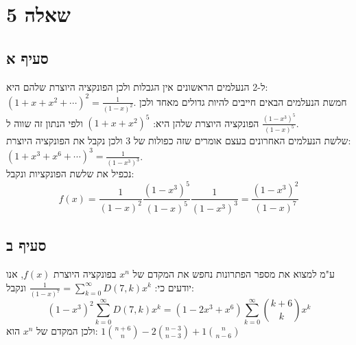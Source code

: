 \documentclass{article}
\begin{document}
	\pagebreak
	\section*{שאלה 5}
	\subsection*{סעיף א}
	ל-2 הנעלמים הראשונים אין הגבלות ולכן הפונקציה היוצרת שלהם היא: \\ $(1+x+x^2 + \cdots)^2 = \frac{1}{(1-x)^2}$.
	חמשת הנעלמים הבאים חייבים להיות גדולים מאחד ולכן הפונקציה היוצרת שלהן היא: $(1+x+x^2)^5$ ולפי הנתון זה שווה ל $\frac{(1-x^3)^5}{(1-x)^5}$. \\
	שלשת הנעלמים האחרונים בעצם אומרים שזה כפולות של 3 ולכן נקבל את הפונקציה היוצרת: $(1 + x^3 + x^6 + \cdots)^3 = \frac{1}{(1-x^3)^3}$. \\
	נכפיל את שלשת הפונקציות ונקבל:
	\[
		f(x) = \frac{1}{(1-x)^2}\frac{(1-x^3)^5}{(1-x)^5}\frac{1}{(1-x^3)^3} = \frac{(1-x^3)^2}{(1-x)^7}
	\]

	\subsection*{סעיף ב}
	ע"מ למצוא את מספר הפתרונות נחפש את המקדם של $x^n$ בפונקציה היוצרת $f(x)$,
	אנו יודעים כי: $\frac{1}{(1-x)^7} = \sum_{k=0}^\infty D(7, k)x^k$ ונקבל:
	\[
		(1-x^3)^2\sum_{k=0}^\infty D(7, k)x^k = (1 - 2x^3 + x^6)\sum_{k=0}^\infty {k + 6 \choose k}x^k
	\]
	ולכן המקדם של $x^n$ הוא: $1{n + 6 \choose n} - 2{n - 3 \choose n - 3} + 1{n \choose n - 6}$

	
\end{document}
